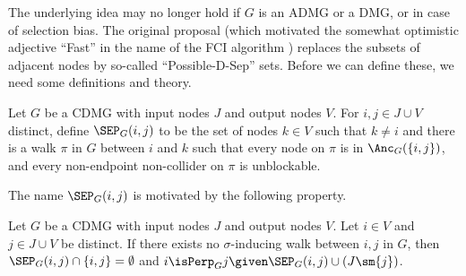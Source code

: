 The underlying idea may no longer hold if $G$ is an ADMG or a DMG, or in case of selection bias.
The original proposal (which motivated the somewhat optimistic adjective ``Fast'' in the name of the FCI algorithm \cite{SMR1995}) replaces the subsets of adjacent nodes by so-called ``Possible-D-Sep'' sets. 
Before we can define these, we need some definitions and theory.

\begin{Def}\label{def:SEP}
  Let $G$ be a CDMG with input nodes $J$ and output nodes $V$.
  For $i,j \in J \cup V$ distinct, define $\SEP_G(i,j)$ to be the set of nodes $k \in V$ such that
  $k \ne i$ and there is a walk $\pi$ in $G$ between $i$ and $k$ such that every node
  on $\pi$ is in $\Anc_G(\{i,j\})$, and every non-endpoint non-collider on $\pi$ is unblockable.
\end{Def}
The name $\SEP_G(i,j)$ is motivated by the following property.
\begin{Prp}\label{prp:SEP}
  Let $G$ be a CDMG with input nodes $J$ and output nodes $V$.
  Let $i \in V$ and $j \in J \cup V$ be distinct.
  If there exists no $\sigma$-inducing walk between $i,j$ in $G$, then $\SEP_G(i,j) \cap \{i,j\} = \emptyset$ and $i \isPerp_G j \given \SEP_G(i,j) \cup (J \sm \{j\})$.
\end{Prp}
